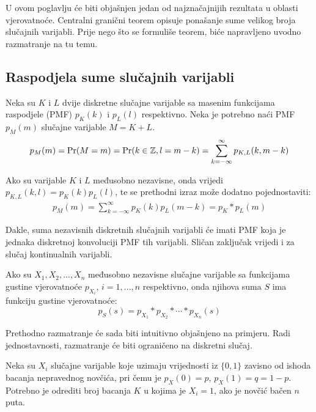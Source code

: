U ovom poglavlju će biti objašnjen jedan od najznačajnijih rezultata u oblasti
vjerovatnoće. Centralni granični teorem opisuje ponašanje sume velikog broja
slučajnih varijabli. Prije nego što se formuliše teorem, biće napravljeno uvodno
razmatranje na tu temu.

\subsection{Raspodjela sume slučajnih varijabli} \label{sec:clt-suma}

Neka su $K$ i $L$ dvije diskretne slučajne varijable sa masenim funkcijama
raspodjele (PMF) $p_K(k)$ i $p_L(l)$ respektivno. Neka je potrebno naći PMF
$p_M(m)$ slučajne varijable $M=K+L$.
%
\begin{align*}
  p_M(m) = \mathrm{Pr}(M=m) = \mathrm{Pr}(k\in\mathbb{Z}, l=m-k)
  = \sum_{k=-\infty}^{\infty} p_{K,L}(k,m-k)
\end{align*}

Ako su varijable $K$ i $L$ međusobno nezavisne, onda vrijedi $p_{K,L}(k,l) =
p_K(k)p_L(l)$, te se prethodni izraz može dodatno pojednostaviti:
%
\begin{align*}
  p_M(m) = \sum_{k=-\infty}^{\infty} p_K(k)p_L(m-k) = p_K * p_L (m)
\end{align*}

Dakle, suma nezavisnih diskretnih slučajnih varijabli će imati PMF koja je
jednaka diskretnoj konvoluciji PMF tih varijabli. Sličan zaključak vrijedi i za
slučaj kontinualnih varijabli.

\begin{theorem} %

  Ako su $X_1,X_2,...,X_n$ međusobno nezavisne slučajne varijable sa funkcijama
  gustine vjerovatnoće $p_{X_i}$, $i=1,...,n$ respektivno, onda njihova suma $S$
  ima funkciju gustine vjerovatnoće:
  $$p_S(s) = p_{X_1} * p_{X_2} * \cdots * p_{X_n} (s)$$

\end{theorem}

Prethodno razmatranje će sada biti intuitivno objašnjeno na primjeru.  Radi
jednostavnosti, razmatranje će biti ograničeno na diskretni slučaj.

\begin{exmp} \label{ex:novcic}
  
Neka su $X_i$ slučajne varijable koje uzimaju vrijednosti iz $\{0,1\}$ zavisno
od ishoda bacanja nepravednog novčića, pri čemu je $p_X(0)= p$, $p_X(1)=q=1-p$.
Potrebno je odrediti broj bacanja $K$ u kojima je $X_i=1$, ako je novčić bačen
$n$ puta.

\end{exmp}

